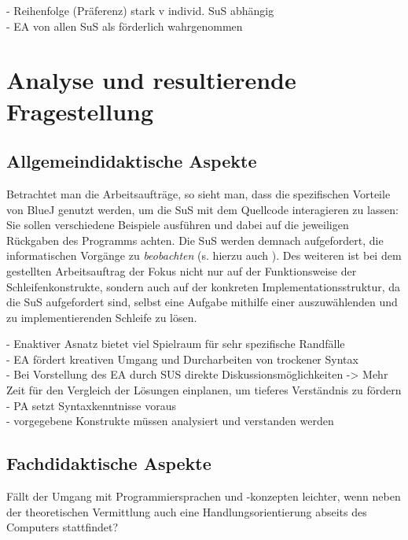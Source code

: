 \documentclass[paper=a4, DIV=13, BCOR=12mm, twoside=on, onecolumn=on, open = any, titlepage =on, parskip =half-, headsepline = on, footsepline = on, chapterprefix = on, sectionprefix = on, appendixprefix = off, fontsize = 11pt, numbers = noenddot, abstract = off]{scrreprt}
\begin{document}
- Reihenfolge (Präferenz) stark v individ. SuS abhängig\\
- EA von allen SuS als förderlich wahrgenommen\\



\par \singlespacing
 \section{Analyse und resultierende Fragestellung}
\onehalfspacing

\par \singlespacing
\subsection*{Allgemeindidaktische Aspekte}
\onehalfspacing
Betrachtet man die Arbeitsaufträge, so sieht man, dass die spezifischen Vorteile von BlueJ genutzt werden, um die SuS mit dem Quellcode interagieren zu lassen: Sie sollen verschiedene Beispiele ausführen und dabei auf die jeweiligen Rückgaben des Programms achten. Die SuS werden demnach aufgefordert, die informatischen Vorgänge zu \emph{beobachten} (s. hierzu auch \cite[S.67ff.]{aebli:11}). Des weiteren ist bei dem gestellten Arbeitsauftrag der Fokus nicht nur auf der Funktionsweise der Schleifenkonstrukte, sondern auch auf der konkreten Implementationsstruktur, da die SuS aufgefordert sind, selbst eine Aufgabe mithilfe einer auszuwählenden und zu implementierenden Schleife zu lösen. 

- Enaktiver Asnatz bietet viel Spielraum für sehr spezifische Randfälle\\
- EA fördert kreativen Umgang und Durcharbeiten von trockener Syntax\\
- Bei Vorstellung des EA durch SUS direkte Diskussionsmöglichkeiten -> Mehr Zeit für den Vergleich der Lösungen einplanen, um tieferes Verständnis zu fördern\\
- PA setzt Syntaxkenntnisse voraus\\
- vorgegebene Konstrukte müssen analysiert und verstanden werden\\


\par \singlespacing
\subsection*{Fachdidaktische Aspekte}
\onehalfspacing

Fällt der Umgang mit Programmiersprachen und -konzepten leichter, wenn neben der theoretischen Vermittlung auch eine Handlungsorientierung abseits des Computers stattfindet?
\end{document}
